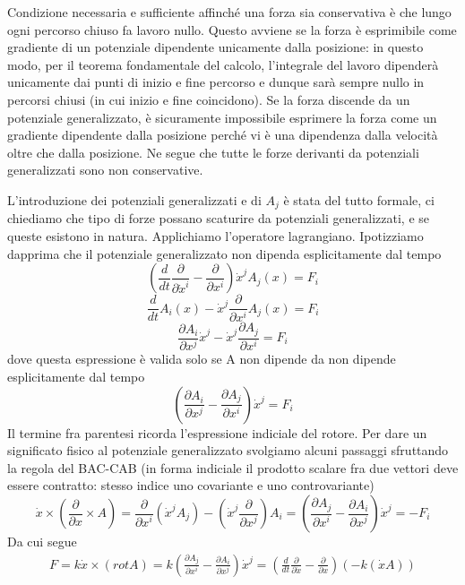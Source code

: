 \documentclass[
10pt, %
a4paper, %
oneside, %
headinclude,footinclude, %
BCOR5mm, %
]{scrartcl}
\begin{document}
\begin{osservazione}[Conservatività]
	Condizione necessaria e sufficiente affinché una forza sia conservativa è che lungo ogni percorso chiuso fa lavoro nullo. Questo avviene se la forza è esprimibile come gradiente di un potenziale dipendente unicamente dalla posizione: in questo modo, per il teorema fondamentale del calcolo, l'integrale del lavoro dipenderà unicamente dai punti di inizio e fine percorso e dunque sarà sempre nullo in percorsi chiusi (in cui inizio e fine coincidono). Se la forza discende da un potenziale generalizzato, è sicuramente impossibile esprimere la forza come un gradiente dipendente dalla posizione perché vi è una dipendenza dalla velocità oltre che dalla posizione. Ne segue che tutte le forze derivanti da potenziali generalizzati sono non conservative.  
\end{osservazione}
L'introduzione dei potenziali generalizzati e di \(A_j\) è stata del tutto formale, ci chiediamo che tipo di forze possano scaturire da potenziali generalizzati, e se queste esistono in natura. Applichiamo l'operatore lagrangiano. Ipotizziamo dapprima che il potenziale generalizzato non dipenda esplicitamente dal tempo
\[\left(\frac{d}{dt}\frac{\partial}{\partial \dot{x}^i}-\frac{\partial}{\partial x^i}\right)\dot{x}^jA_j(x) = F_i\]
\[\frac{d}{dt}A_i(x)-\dot{x}^j\frac{\partial}{\partial x^i}A_j(x)= F_i\]
\[\frac{\partial A_i}{\partial x^j}\dot{x}^j-\dot{x}^j\frac{\partial A_j}{\partial x^i}= F_i\]
dove questa espressione è valida solo se A non dipende da non dipende esplicitamente dal tempo
\[\left(\frac{\partial A_i}{\partial x^j}-\frac{\partial A_j}{\partial x^i}\right)\dot{x}^j=F_i\]
Il termine fra parentesi ricorda l'espressione indiciale del rotore. Per dare un significato fisico al potenziale generalizzato svolgiamo alcuni passaggi sfruttando la regola del BAC-CAB (in forma indiciale il prodotto scalare fra due vettori deve essere contratto: stesso indice uno covariante e uno controvariante)
\[\dot{x}\times\left(\frac{\partial}{\partial x}\times A\right) = \frac{\partial }{\partial x^i}(\dot{x}^jA_j)-\left(\dot{x}^j\frac{\partial}{\partial x^j}\right)A_i= \left(\frac{\partial A_j}{\partial x^i}-\frac{\partial A_i}{\partial x^j}\right)\dot{x}^j = -F_i\]
Da cui segue
\begin{align}\label{eq:f-gen}
	F = k\dot{x}\times (rotA)=k\left(\frac{\partial A_j}{\partial x^i}-\frac{\partial A_i}{\partial x^j}\right)\dot{x}^j = \left(\frac{d}{dt}\frac{\partial}{\partial \dot{x}}-\frac{\partial}{\partial x}\right)(-k(\dot{x}A)) 
\end{align}
\end{document}
